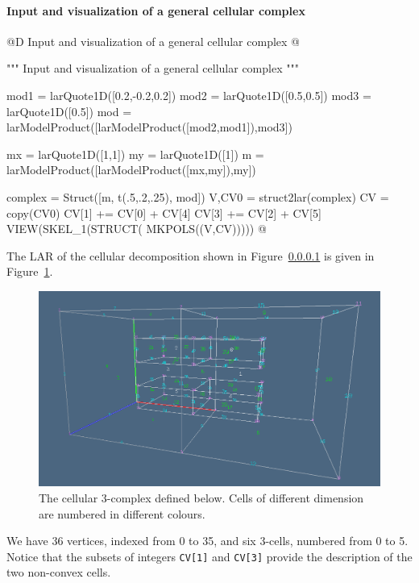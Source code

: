 \documentclass[11pt,oneside]{article}    %
\begin{document}
\paragraph{Input and visualization of a general cellular complex}


@D Input and visualization of a general cellular complex
@{""" Input and visualization of a general cellular complex """

mod1 = larQuote1D([0.2,-0.2,0.2])
mod2 = larQuote1D([0.5,0.5])
mod3 = larQuote1D([0.5])
mod = larModelProduct([larModelProduct([mod2,mod1]),mod3])

mx = larQuote1D([1,1])
my = larQuote1D([1])
m = larModelProduct([larModelProduct([mx,my]),my])

complex = Struct([m, t(.5,.2,.25), mod])
V,CV0 = struct2lar(complex)
CV = copy(CV0)
CV[1] += CV[0] + CV[4]
CV[3] += CV[2] + CV[5]
VIEW(SKEL_1(STRUCT( MKPOLS((V,CV)))))
@}

The LAR of the cellular decomposition shown in Figure~\ref{} is given in Figure~\ref{fig:3chains00}.
\begin{figure}[htbp] %
   \centering
   \includegraphics[width=\linewidth]{images/3chains00} 
   \caption{The cellular 3-complex defined below. Cells of different dimension are numbered in different colours.}
   \label{fig:3chains00}
\end{figure}

We have 36 vertices, indexed from 0 to 35, and six 3-cells, numbered from 0 to 5.
Notice that the subsets of integers  \texttt{CV[1]} and \texttt{CV[3]} provide the 
description of the two non-convex cells.
\end{document}
